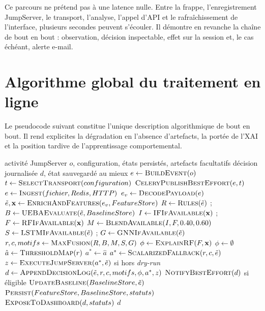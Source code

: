 \documentclass[11pt,a4paper,oneside]{report}
\theoremstyle{definition}
\theoremstyle{plain}
\begin{document}
Ce parcours ne prétend pas à une latence nulle. Entre la frappe, l'enregistrement
JumpServer, le transport, l'analyse, l'appel d'API et le rafraîchissement de
l'interface, plusieurs secondes peuvent s'écouler. Il démontre en revanche la
chaîne de bout en bout : observation, décision inspectable, effet sur la
session et, le cas échéant, alerte e-mail.

\section{Algorithme global du traitement en ligne}

Le pseudocode suivant constitue l'unique description algorithmique de bout en
bout. Il rend explicites la dégradation en l'absence d'artefacts, la portée de
l'XAI et la position tardive de l'apprentissage comportemental.

\begin{algorithm}[H]
\caption{Traitement en ligne global d'un événement CyberVault}
\label{alg:method-online}
\begin{algorithmic}[1]
\Require activité JumpServer \(o\), configuration, états persistés, artefacts facultatifs
\Ensure décision journalisée \(d\), état sauvegardé au mieux
\State \(e\leftarrow\Call{BuildEvent}{o}\)
\State \(t\leftarrow\Call{SelectTransport}{configuration}\)
\State \(\Call{CeleryPublishBestEffort}{e,t}\)
\State \(e\leftarrow\Call{Ingest}{fichier,Redis,HTTP}\) 
\State \(e_v\leftarrow\Call{DecodePayload}{e}\) 
\State \(\tilde e,\mathbf{x}\leftarrow\Call{EnrichAndFeatures}{e_v,FeatureStore}\)
\State \(R\leftarrow\Call{Rules}{\tilde e}\) ; \(B\leftarrow\Call{UEBAEvaluate}{\tilde e,BaselineStore}\)
\State \(I\leftarrow\Call{IFIfAvailable}{\mathbf{x}}\) ; \(F\leftarrow\Call{RFIfAvailable}{\mathbf{x}}\)
\State \(M\leftarrow\Call{BlendAvailable}{I,F,0.40,0.60}\) 
\State \(S\leftarrow\Call{LSTMIfAvailable}{\tilde e}\) ; \(G\leftarrow\Call{GNNIfAvailable}{\tilde e}\)
\State \(r,c,motifs\leftarrow\Call{MaxFusion}{R,B,M,S,G}\)
  \State \(\phi\leftarrow\Call{ExplainRF}{F,\mathbf{x}}\)
\Else
  \State \(\phi\leftarrow\emptyset\)
\EndIf
\State \(\hat a\leftarrow\Call{ThresholdMap}{r}\)
  \State \(a^*\leftarrow\hat a\)
\Else
  \State \(a^*\leftarrow\Call{ScalarizedFallback}{r,c,\tilde e}\)
\EndIf
\State \(z\leftarrow\Call{ExecuteJumpServer}{a^*,\tilde e}\) si hors \emph{dry-run}
\State \(d\leftarrow\Call{AppendDecisionLog}{\tilde e,r,c,motifs,\phi,a^*,z}\)
\State \(\Call{NotifyBestEffort}{d}\) si éligible
  \State \(\Call{UpdateBaseline}{BaselineStore,\tilde e}\)
\EndIf
\State \(\Call{Persist}{FeatureStore,BaselineStore,statuts}\)
\State \(\Call{ExposeToDashboard}{d,statuts}\) 
\State \Return \(d\)
\end{algorithmic}
\end{algorithm}
\end{document}
